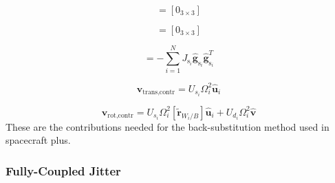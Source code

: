 \begin{equation}
[B_\text{contr}] = [0_{3 \times 3}]
\end{equation}

\begin{equation}
[C_\text{contr}] = [0_{3 \times 3}]
\end{equation}

\begin{equation}
[D_\text{contr}] = -\sum_{i=1}^{N}J_{\text{s}_i} \hat{\bm g}_{\text{s}_i} \hat{\bm g}_{\text{s}_i}^T
\end{equation}

\begin{equation}
\bm v_{\text{trans,contr}} = U_{s_i}\Omega_i^2\hat{\bm{u}}_i
\end{equation}

\begin{equation}
\bm v_{\text{rot,contr}} =  U_{s_i}\Omega_i^2[\tilde{\bm{r}}_{W_i/B}]\hat{\bm{u}}_i + U_{d_i}\Omega_i^2\hat{\bm{v}}
\end{equation}
These are the contributions needed for the back-substitution method used in spacecraft plus.

\subsubsection{Fully-Coupled Jitter}

